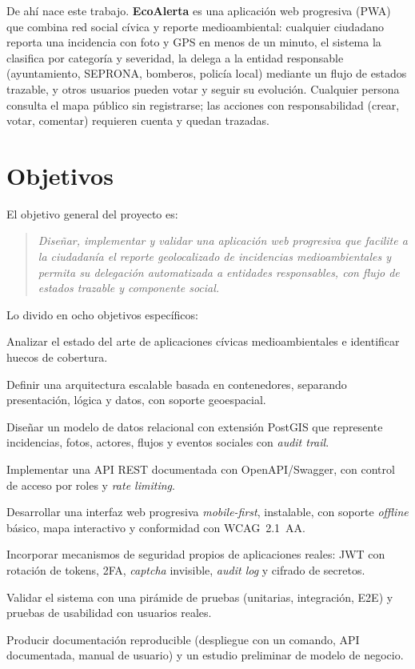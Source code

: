 De ahí nace este trabajo. \textbf{EcoAlerta} es una aplicación web progresiva (PWA) que combina red social cívica y reporte medioambiental: cualquier ciudadano reporta una incidencia con foto y GPS en menos de un minuto, el sistema la clasifica por categoría y severidad, la delega a la entidad responsable (ayuntamiento, SEPRONA, bomberos, policía local) mediante un flujo de estados trazable, y otros usuarios pueden votar y seguir su evolución. Cualquier persona consulta el mapa público sin registrarse; las acciones con responsabilidad (crear, votar, comentar) requieren cuenta y quedan trazadas.


\section{Objetivos}
\label{sec:objetivos}

El objetivo general del proyecto es:

\begin{quote}
\textit{Diseñar, implementar y validar una aplicación web progresiva que facilite a la ciudadanía el reporte geolocalizado de incidencias medioambientales y permita su delegación automatizada a entidades responsables, con flujo de estados trazable y componente social.}
\end{quote}

Lo divido en ocho objetivos específicos:

\begin{description}[leftmargin=2.2cm, style=nextline, labelindent=0.3cm]
  \item[OBJ-1] Analizar el estado del arte de aplicaciones cívicas medioambientales e identificar huecos de cobertura.
  \item[OBJ-2] Definir una arquitectura escalable basada en contenedores, separando presentación, lógica y datos, con soporte geoespacial.
  \item[OBJ-3] Diseñar un modelo de datos relacional con extensión PostGIS que represente incidencias, fotos, actores, flujos y eventos sociales con \textit{audit trail}.
  \item[OBJ-4] Implementar una API REST documentada con OpenAPI/Swagger, con control de acceso por roles y \textit{rate limiting}.
  \item[OBJ-5] Desarrollar una interfaz web progresiva \textit{mobile-first}, instalable, con soporte \textit{offline} básico, mapa interactivo y conformidad con WCAG~2.1~AA.
  \item[OBJ-6] Incorporar mecanismos de seguridad propios de aplicaciones reales: JWT con rotación de tokens, 2FA, \textit{captcha} invisible, \textit{audit log} y cifrado de secretos.
  \item[OBJ-7] Validar el sistema con una pirámide de pruebas (unitarias, integración, E2E) y pruebas de usabilidad con usuarios reales.
  \item[OBJ-8] Producir documentación reproducible (despliegue con un comando, API documentada, manual de usuario) y un estudio preliminar de modelo de negocio.
\end{description}


